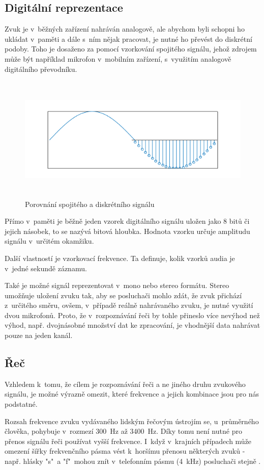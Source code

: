 \subsection{Digitální reprezentace}
Zvuk je v~běžných zařízení nahráván analogově, ale abychom byli schopni ho ukládat v~paměti a dále s~ním nějak pracovat, je nutné ho převést do diskrétní podoby. Toho je dosaženo za pomocí vzorkování spojitého signálu, jehož zdrojem může být například mikrofon v~mobilním zařízení, s~využitím analogově digitálního převodníku. 
\begin{figure}[H]
	\centering
		\includegraphics[height=6cm]{obrazky-figures/discrete_continuous_signal.png}
        \caption{Porovnání spojitého a diskrétního signálu}
\end{figure}
Přímo v~paměti je běžně jeden vzorek digitálního signálu uložen jako 8 bitů či jejich násobek, to se nazývá bitová hloubka. Hodnota vzorku určuje amplitudu signálu v~určitém okamžiku. 

Další vlastností je vzorkovací frekvence. Ta definuje, kolik vzorků audia je v~jedné sekundě záznamu.

Také je možné signál reprezentovat v~mono nebo stereo formátu. Stereo umožňuje uložení zvuku tak, aby se posluchači mohlo zdát, že zvuk přichází z~určitého směru, ovšem, v~případě reálně nahrávaného zvuku, je nutné využití dvou mikrofonů. Proto, že v~rozpoznávání řeči by tohle přineslo více nevýhod než výhod, např. dvojnásobné množství dat ke zpracování, je vhodnější data nahrávat pouze na jeden kanál.

\subsection{Řeč}
Vzhledem k~tomu, že cílem je rozpoznávání řeči a ne jiného druhu zvukového signálu, je možné výrazně omezit, které frekvence a jejich kombinace jsou pro nás podstatné.

Rozsah frekvence zvuku vydávaného lidským řečovým ústrojím se, u~průměrného člověka, pohybuje v~rozmezí 300~Hz až 3400~Hz. Díky tomu není nutné pro přenos signálu řeči používat vyšší frekvence. I~když v~krajních případech může omezení šířky frekvenčního pásma vést k~horšímu přenosu některých zvuků - např. hlásky "s"~a "f"~mohou znít v~telefonním pásmu (4~kHz) posluchači stejně \cite{human-hearing}.
